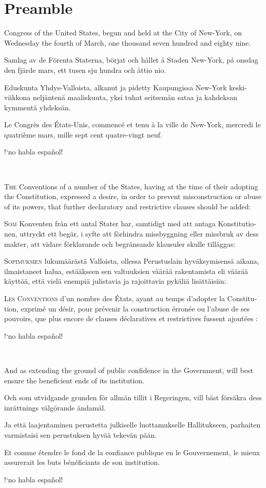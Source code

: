 \documentclass[a4paper,landscape,10pt]{article}
\newcommand{\tblock}[5]{\noindent\begin{minipage}[t]{0.18\textwidth}\foreignlanguage{english}{#1}\end{minipage}\hskip 0.025\textwidth\begin{minipage}[t]{0.18\textwidth}\foreignlanguage{swedish}{#2}\end{minipage}\hskip 0.025\textwidth\begin{minipage}[t]{0.18\textwidth}\foreignlanguage{finnish}{#3}\end{minipage}\hskip 0.025\textwidth\begin{minipage}[t]{0.18\textwidth}\foreignlanguage{french}{#4}\end{minipage}\hskip 0.025\textwidth\begin{minipage}[t]{0.18\textwidth}\foreignlanguage{spanish}{#5}\end{minipage}}
\begin{document}
\section*{Preamble}


\tblock
{Congress of the United States, begun and held at the City of New-York, on Wednesday the fourth of March, one thousand seven hundred and eighty nine.}
{Samlag av de Förenta Staterna, börjat och hållet å Staden New-York, på onsdag den fjärde mars, ett tusen sju hundra och åttio nio.}
{Eduskunta Yhdys-Valloista, alkanut ja pidetty Kaupungissa New-York keski-viikkona neljäntenä maaliskuuta, yksi tuhat seitsemän sataa ja kahdeksan kymmentä yhdeksän.}
{Le Congrès des États-Unis, commencé et tenu à la ville de New-York, mercredi le quatrième mars, mille sept cent quatre-vingt neuf.}
{!`no habla español!}

~

\tblock
{\textsc{The} Conventions of a number of the States, having at the time of their adopting the Constitution, expressed a desire, in order to prevent misconstruction or abuse of its powers, that further declaratory and restrictive clauses should be added:}
{\textsc{Som} Konventen från ett antal Stater har, samtidigt med att antaga Konstitutionen, uttryckt ett begär, i syfte att förhindra missbyggning eller missbruk av dess makter, att vidare förklarande och begränsande klausuler skulle tilläggas:}
{\textsc{Sopimuksien} lukumäärästä Valloista, ollessa Perustuslain hyväksymisensä aikana, ilmaistaneet halua, estääkseen sen valtuuksien väärää rakentamista eli väärää käyttöä, että vielä enempiä julistavia ja rajoittavia pykäliä lisättäisiin:}
{\textsc{Les Conventions} d'un nombre des États, ayant au temps d'adopter la Constitution, exprimé un désir, pour prévenir la construction érronée ou l'abuse de ses pouvoirs, que plus encore de clauses déclaratives et restrictives fussent ajoutées :}
{!`no habla español!}

~

\tblock
{And as extending the ground of public confidence in the Government, will best ensure the beneficient ends of its institution.}
{Och som utvidgande grunden för allmän tillit i Regeringen, vill bäst försäkra dess inrättnings välgörande ändamål.}
{Ja että laajentaminen perustetta julkiselle luottamukselle Hallitukseen, parhaiten varmistaisi sen perustuksen hyvää tekevän pään.}
{Et comme étendre le fond de la confiance publique en le Gouvernement, le mieux assurerait les buts bénéficiants de son institution.}
{!`no habla español!}
\end{document}
